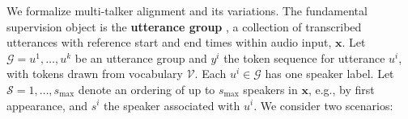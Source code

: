 



We formalize multi-talker alignment and its variations. The fundamental supervision object is the \textbf{utterance group}%
, a collection of transcribed utterances with reference start and end times within
audio input, $\mathbf{x}$. Let $\mathcal{G} = {u^1, \ldots, u^k}$ be an utterance group and $y^i$ the token sequence for utterance $u^i$, with tokens drawn from vocabulary $\mathcal{V}$. Each $u^i \in \mathcal{G}$ has one speaker label. Let $\mathcal{S} = {1, \ldots, s_{\max}}$ denote an ordering of up to $s_{\max}$ speakers in $\mathbf{x}$, e.g., by first appearance, and $s^i$ the speaker associated with $u^i$. We consider two scenarios:

